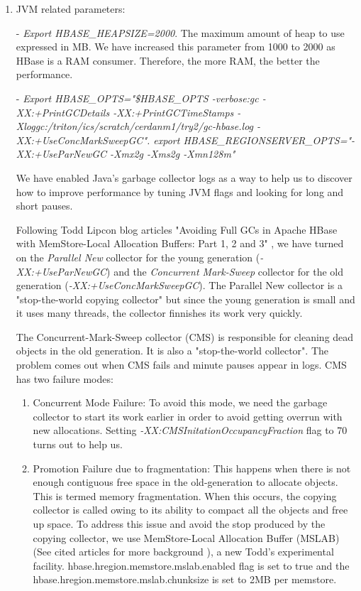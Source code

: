 \begin{enumerate}

\item JVM related parameters:

- \textit{Export HBASE\_HEAPSIZE=2000}. The maximum amount of heap to use expressed in MB. We have increased this parameter from 1000 to 2000 as HBase is a RAM consumer. Therefore, the more RAM, the better the performance.
\par
- \textit{Export HBASE\_OPTS="\$HBASE\_OPTS -verbose:gc -XX:+PrintGCDetails -XX:+PrintGCTimeStamps -Xloggc:/triton/ics/scratch/cerdanm1/try2/gc-hbase.log -XX:+UseConcMarkSweepGC".
export HBASE\_REGIONSERVER\_OPTS="-XX:+UseParNewGC -Xmx2g -Xms2g -Xmn128m"}
\par
We have enabled Java's garbage collector logs as a way to help us to discover how to improve performance by tuning JVM flags and looking for long and short pauses. 
\par
Following Todd Lipcon blog articles "Avoiding Full GCs in Apache HBase with MemStore-Local Allocation Buffers: Part 1, 2 and 3" , we have turned on the \textit{Parallel New} collector for the young generation (\textit{-XX:+UseParNewGC}) and the \textit{Concurrent Mark-Sweep} collector for the old generation (\textit{-XX:+UseConcMarkSweepGC}). The Parallel New collector is a "stop-the-world copying collector" but since the young generation is small and it uses many threads, the collector finnishes its work very quickly.
\par
The Concurrent-Mark-Sweep collector (CMS) is responsible for cleaning dead objects in the old generation. It is also a "stop-the-world collector". The problem comes out when CMS fails and minute pauses appear in logs. CMS has two failure modes:
\begin{enumerate}
\item Concurrent Mode Failure: To avoid this mode, we need the garbage collector to start its work earlier in order to avoid getting overrun with new allocations. Setting \textit{-XX:CMSInitationOccupancyFraction} flag to 70 turns out to help us.
\item Promotion Failure due to fragmentation: This happens when there is not enough contiguous free space in the old-generation to allocate objects. This is termed memory fragmentation. When this occurs, the copying collector is called owing to its ability to compact all the objects and free up space. To address this issue and avoid the stop produced by the copying collector, we use MemStore-Local Allocation Buffer (MSLAB) (See cited articles for more background \cite{ApacheHBaseMSLAB} \cite{MSLAB}), a new Todd's experimental facility.  hbase.hregion.memstore.mslab.enabled flag is set to true and the hbase.hregion.memstore.mslab.chunksize is set to 2MB per memstore.


\end{enumerate}
\end{enumerate}
